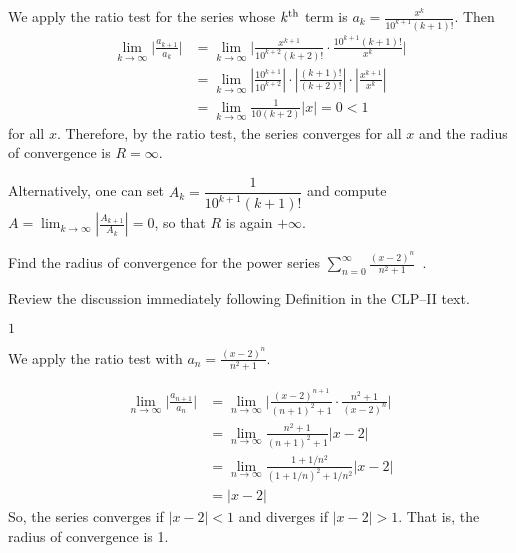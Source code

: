 \begin{solution}
We apply the ratio test for the series whose $k^{\rm th}$
term is $a_k= \frac{x^k}{ 10^{k+1}(k+1)! }$. Then
\begin{align*}
\lim_{k\to\infty} \bigg| \frac{ a_{k+1} }{ a_k } \bigg|
&= \lim_{k\to\infty} \bigg| \frac{x^{k+1}}{10^{k+2}(k+2)!} \cdot
                             \frac{10^{k+1}(k+1)!}{x^k} \bigg| \\
&=\lim_{k\to\infty} \left|\frac{10^{k+1}}{10^{k+2}}\right|\cdot\left|\frac{(k+1)!}{(k+2)!}\right|\cdot\left|\frac{x^{k+1}}{x^k}\right|\\
&= \lim_{k\to\infty}\frac{1}{10(k+2)}|x| = 0 < 1
\end{align*}
for all $x$.
Therefore, by the ratio test, the series converges for all $x$
and the radius of convergence is $R = \infty$.

Alternatively, one can set $A_k = \dfrac{1}{10^{k+1}(k+1)!}$ and compute
$A = \displaystyle\lim_{k\to\infty} \left| \frac{A_{k+1}}{A_k}\right| = 0$, so that
$R$ is again $+\infty$.


\end{solution}


\begin{question}[2014A]
Find the radius of convergence for the power series
$\displaystyle\sum_{n=0}^\infty \frac{(x - 2)^n}{n^2+1}$\ .
\end{question}

\begin{hint}
Review the discussion immediately following Definition
 in the
CLP--II text.
\end{hint}

\begin{answer}
$1$
\end{answer}

\begin{solution}
We apply the ratio test with $a_n = \frac{(x - 2)^n}{n^2+1}$.

\begin{align*}
\lim_{n\rightarrow\infty}\Big|\frac{a_{n+1}}{a_n}\Big|
&=\lim_{n\rightarrow\infty}\bigg|\frac{(x-2)^{n+1}}{(n+1)^2+1}\cdot
                               \frac{n^2+1}{(x-2)^n}\bigg|\\
&=\lim_{n\rightarrow\infty}\frac{n^2+1}{(n+1)^2+1}
                               |x-2|\\
&=\lim_{n\rightarrow\infty}\frac{1+1/n^2}{(1+1/n)^2+1/n^2}
                               |x-2|\\
&=|x-2|
\end{align*}
So, the series converges if $|x-2|<1$ and diverges if $|x-2|>1$.
That is, the radius of convergence is 1.
\end{solution}


